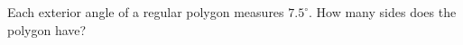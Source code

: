 Each exterior angle of a regular polygon measures $7.5^\circ$. How many sides does the polygon have?
